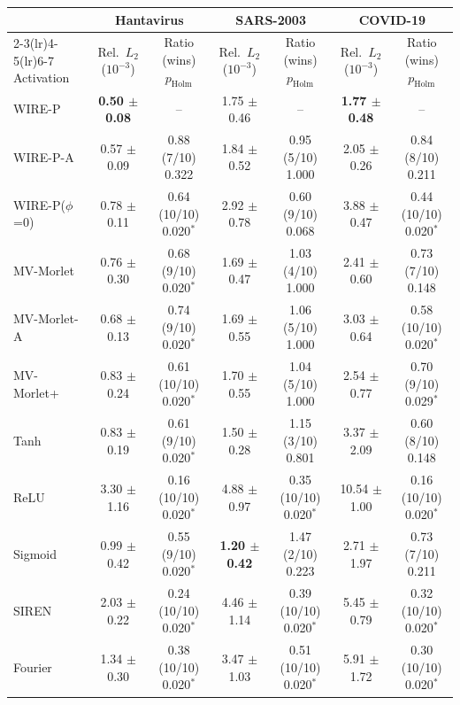 \begin{tabular}{lcccccc}
\toprule
 & \multicolumn{2}{c}{Hantavirus} & \multicolumn{2}{c}{SARS-2003} & \multicolumn{2}{c}{COVID-19} \\
\cmidrule(lr){2-3}\cmidrule(lr){4-5}\cmidrule(lr){6-7}
Activation & Rel.\ $L_2$ ($10^{-3}$) & Ratio (wins) $p_\text{Holm}$ & Rel.\ $L_2$ ($10^{-3}$) & Ratio (wins) $p_\text{Holm}$ & Rel.\ $L_2$ ($10^{-3}$) & Ratio (wins) $p_\text{Holm}$ \\
\midrule
WIRE-P & \textbf{0.50 $\pm$ 0.08} & -- & 1.75 $\pm$ 0.46 & -- & \textbf{1.77 $\pm$ 0.48} & -- \\
WIRE-P-A & 0.57 $\pm$ 0.09 & 0.88 (7/10) 0.322 & 1.84 $\pm$ 0.52 & 0.95 (5/10) 1.000 & 2.05 $\pm$ 0.26 & 0.84 (8/10) 0.211 \\
WIRE-P($\phi$=0) & 0.78 $\pm$ 0.11 & 0.64 (10/10) 0.020$^{*}$ & 2.92 $\pm$ 0.78 & 0.60 (9/10) 0.068 & 3.88 $\pm$ 0.47 & 0.44 (10/10) 0.020$^{*}$ \\
MV-Morlet & 0.76 $\pm$ 0.30 & 0.68 (9/10) 0.020$^{*}$ & 1.69 $\pm$ 0.47 & 1.03 (4/10) 1.000 & 2.41 $\pm$ 0.60 & 0.73 (7/10) 0.148 \\
MV-Morlet-A & 0.68 $\pm$ 0.13 & 0.74 (9/10) 0.020$^{*}$ & 1.69 $\pm$ 0.55 & 1.06 (5/10) 1.000 & 3.03 $\pm$ 0.64 & 0.58 (10/10) 0.020$^{*}$ \\
MV-Morlet+ & 0.83 $\pm$ 0.24 & 0.61 (10/10) 0.020$^{*}$ & 1.70 $\pm$ 0.55 & 1.04 (5/10) 1.000 & 2.54 $\pm$ 0.77 & 0.70 (9/10) 0.029$^{*}$ \\
Tanh & 0.83 $\pm$ 0.19 & 0.61 (9/10) 0.020$^{*}$ & 1.50 $\pm$ 0.28 & 1.15 (3/10) 0.801 & 3.37 $\pm$ 2.09 & 0.60 (8/10) 0.148 \\
ReLU & 3.30 $\pm$ 1.16 & 0.16 (10/10) 0.020$^{*}$ & 4.88 $\pm$ 0.97 & 0.35 (10/10) 0.020$^{*}$ & 10.54 $\pm$ 1.00 & 0.16 (10/10) 0.020$^{*}$ \\
Sigmoid & 0.99 $\pm$ 0.42 & 0.55 (9/10) 0.020$^{*}$ & \textbf{1.20 $\pm$ 0.42} & 1.47 (2/10) 0.223 & 2.71 $\pm$ 1.97 & 0.73 (7/10) 0.211 \\
SIREN & 2.03 $\pm$ 0.22 & 0.24 (10/10) 0.020$^{*}$ & 4.46 $\pm$ 1.14 & 0.39 (10/10) 0.020$^{*}$ & 5.45 $\pm$ 0.79 & 0.32 (10/10) 0.020$^{*}$ \\
Fourier & 1.34 $\pm$ 0.30 & 0.38 (10/10) 0.020$^{*}$ & 3.47 $\pm$ 1.03 & 0.51 (10/10) 0.020$^{*}$ & 5.91 $\pm$ 1.72 & 0.30 (10/10) 0.020$^{*}$ \\
\bottomrule
\end{tabular}